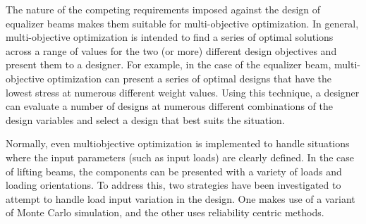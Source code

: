 The nature of the competing requirements imposed against the design of equalizer beams makes them suitable for multi-objective optimization. In general, multi-objective optimization is intended to find a series of optimal solutions across a range of values for the two (or more) different design objectives and present them to a designer. For example, in the case of the equalizer beam, multi-objective optimization can present a series of optimal designs that have the lowest stress at numerous different weight values.  Using this technique, a designer can evaluate a number of designs at numerous different combinations of the design variables and select a design that best suits the situation. 

Normally, even multiobjective optimization is implemented to handle situations where the input parameters (such as input loads) are clearly defined. In the case of lifting beams, the components can be presented with a variety of loads and loading orientations. To address this, two strategies have been investigated to attempt to handle load input variation in the design. One makes use of a variant of Monte Carlo simulation, and the other uses reliability centric methods. 
